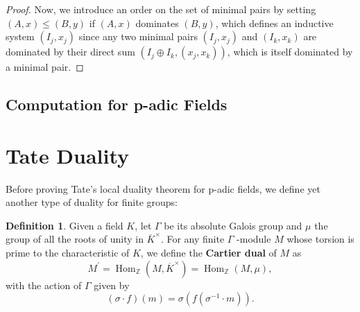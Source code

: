 \documentclass[a4paper, oneside]{memoir}
\def\Z{\mathbb{Z}}
\def\K{K}
\def\Kx{\overline{\K}^\times}
\DeclareMathOperator{\Hom}{Hom}
\theoremstyle{plain}
\theoremstyle{definition}
\newtheorem{definition}[theorem]{Definition}
\theoremstyle{remark}
\begin{document}
\begin{proof}
    Now, we introduce an order on the set of minimal pairs by setting \((A,x)\leq (B,y)\) if \((A,x)\) dominates \((B,y)\), which defines an inductive system \((I_j,x_j)\) since any two minimal pairs \((I_j,x_j)\) and \((I_k,x_k)\) are dominated by their direct sum \(\left(I_j\oplus I_k,(x_j,x_k)\right)\), which is itself dominated by a minimal pair.


\end{proof}

\subsection{Computation for p-adic Fields}

\section{Tate Duality}

Before proving Tate's local duality theorem for p-adic fields, we define
yet another type of duality for finite groups:

\begin{definition}
    Given a field \(\K\), let  $\Gamma$ be its absolute Galois group and $\mu$ the group of all the roots of unity in $\Kx$.
    For any finite \(\Gamma\) -module \(M\) whose torsion is prime to the characteristic of \(\K\),
    we define the \textbf{Cartier dual} of $M$ as
    \begin{equation*}
        M^{\prime} = \Hom_{\Z}(M, \Kx)=\Hom_{\Z}(M, \mu),
    \end{equation*}
    with the action of $\Gamma$ given by
    \begin{equation*}
        (\sigma \cdot f)(m) = \sigma(f(\sigma^{-1}\cdot m)).
    \end{equation*}
\end{definition}
\end{document}

